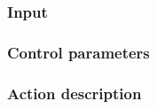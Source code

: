 \subsection{\pVertexFitter}

\subsubsection{Input}
\subsubsection{Control parameters}
\subsubsection{Action description}


